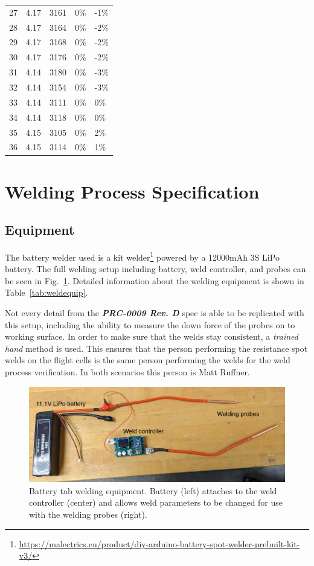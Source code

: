 \documentclass{article}
\begin{document}
\begin{table}[H]
\begin{tabular}{lllll}
        27 & 4.17 & 3161 & 0\% & -1\% \\ 
        28 & 4.17 & 3164 & 0\% & -2\% \\ 
        29 & 4.17 & 3168 & 0\% & -2\% \\ 
        30 & 4.17 & 3176 & 0\% & -2\% \\ 
        31 & 4.14 & 3180 & 0\% & -3\% \\ 
        32 & 4.14 & 3154 & 0\% & -3\% \\ 
        33 & 4.14 & 3111 & 0\% & 0\% \\ 
        34 & 4.14 & 3118 & 0\% & 0\% \\ 
        35 & 4.15 & 3105 & 0\% & 2\% \\ 
        36 & 4.15 & 3114 & 0\% & 1\% \\ 
    \end{tabular}
    \label{tab:acc2}
\end{table}

\section{Welding Process Specification}

\subsection{Equipment}

The battery welder used is a kit welder\footnote{\url{https://malectrics.eu/product/diy-arduino-battery-spot-welder-prebuilt-kit-v3/}} powered by a 12000mAh 3S LiPo battery. The full welding setup including battery, weld controller, and probes can be seen in Fig.~\ref{fig:welder}. Detailed information about the welding equipment is shown in Table~\ref{tab:weldequip}. 

Not every detail from the \textit{\textbf{PRC-0009 Rev. D}} spec is able to be replicated with this setup, including the ability to measure the down force of the probes on to working surface. In order to make sure that the welds stay consistent, a \textit{trained hand} method is used. This ensures that the person performing the resistance spot welds on the flight cells is the same person performing the welds for the weld process verification. In both scenarios this person is Matt Ruffner.

\begin{figure}[h!]
\centering
\includegraphics[width=\textwidth]{images/welder}
\caption{Battery tab welding equipment. Battery (left) attaches to the weld controller (center) and allows weld parameters to be changed for use with the welding probes (right).}
\label{fig:welder}
\end{figure}
\end{document}
